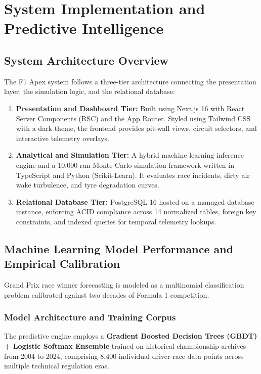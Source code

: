 \documentclass[12pt,a4paper]{report}
\begin{document}
\chapter{System Implementation and Predictive Intelligence}

\section{System Architecture Overview}
The F1 Apex system follows a three-tier architecture connecting the presentation layer, the simulation logic, and the relational database:
\begin{enumerate}
    \item \textbf{Presentation and Dashboard Tier:} Built using Next.js 16 with React Server Components (RSC) and the App Router. Styled using Tailwind CSS with a dark theme, the frontend provides pit-wall views, circuit selectors, and interactive telemetry overlays.
    \item \textbf{Analytical and Simulation Tier:} A hybrid machine learning inference engine and a 10,000-run Monte Carlo simulation framework written in TypeScript and Python (Scikit-Learn). It evaluates race incidents, dirty air wake turbulence, and tyre degradation curves.
    \item \textbf{Relational Database Tier:} PostgreSQL 16 hosted on a managed database instance, enforcing ACID compliance across 14 normalized tables, foreign key constraints, and indexed queries for temporal telemetry lookups.
\end{enumerate}

\section{Machine Learning Model Performance and Empirical Calibration}
Grand Prix race winner forecasting is modeled as a multinomial classification problem calibrated against two decades of Formula 1 competition. 

\subsection{Model Architecture and Training Corpus}
The predictive engine employs a \textbf{Gradient Boosted Decision Trees (GBDT) + Logistic Softmax Ensemble} trained on historical championship archives from 2004 to 2024, comprising 8,400 individual driver-race data points across multiple technical regulation eras. 
\end{document}
